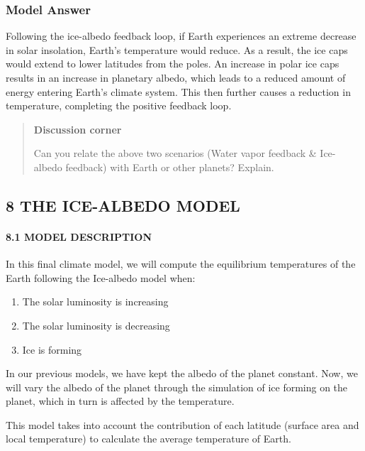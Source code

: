 \documentclass[
  letterpaper,
  DIV=11,
  numbers=noendperiod]{scrartcl}
\let\oldparagraph\paragraph
\renewcommand{\paragraph}[1]{\oldparagraph{#1}\mbox{}}
\providecommand{\tightlist}{%
  \setlength{\itemsep}{0pt}\setlength{\parskip}{0pt}}\usepackage{longtable,booktabs,array}
\begin{document}
\subsubsection{\texorpdfstring{\textbf{Model Answer}}{Model Answer}}

Following the ice-albedo feedback loop, if Earth experiences an extreme
decrease in solar insolation, Earth's temperature would reduce. As a
result, the ice caps would extend to lower latitudes from the poles. An
increase in polar ice caps results in an increase in planetary albedo,
which leads to a reduced amount of energy entering Earth's climate
system. This then further causes a reduction in temperature, completing
the positive feedback loop.

\begin{quote}
\textbf{Discussion corner}

Can you relate the above two scenarios (Water vapor feedback \&
Ice-albedo feedback) with Earth or other planets? Explain.
\end{quote}

\hypertarget{the-ice-albedo-model}{%
\subsection{8 \textbar{} THE ICE-ALBEDO
MODEL}\label{the-ice-albedo-model}}

\hypertarget{model-description}{%
\paragraph{8.1 MODEL DESCRIPTION}\label{model-description}}

In this final climate model, we will compute the equilibrium
temperatures of the Earth following the Ice-albedo model when:

\begin{enumerate}
\def\labelenumi{\arabic{enumi}.}
\tightlist
\item
  The solar luminosity is increasing
\item
  The solar luminosity is decreasing
\item
  Ice is forming
\end{enumerate}

In our previous models, we have kept the albedo of the planet constant.
Now, we will vary the albedo of the planet through the simulation of ice
forming on the planet, which in turn is affected by the temperature.

This model takes into account the contribution of each latitude (surface
area and local temperature) to calculate the average temperature of
Earth.
\end{document}
